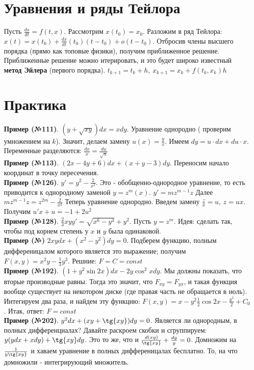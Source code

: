 \section{Уравнения и ряды Тейлора}
Пусть $\frac{dx}{dt}=f(t,x)$. Рассмотрим $x(t_0)=x_0$. Разложим в ряд
Тейлора: $x(t)=x(t_0)+\frac{dx}{dt}(t_0)(t-t_0)+o(t-t_0)$.
Отбросив члены высшего порядка (прямо как топовые физики), получим 
приближенное решение. Приближенные решение можно итерировать, и это
будет широко известный \textbf{метод Эйлера} (первого
порядка). $t_{k+1}=t_k+h,~x_{k+1}=x_k+f(t_k,x_k)h$ 

\section{Практика}
\textbf{Пример (№111)}. $(y+\sqrt{xy})dx=xdy$. Уравнение однородно (
проверим умножением на $k$). Значит, делаем замену $u(x)=\frac{y}{x}$.
Имеем $dy=u\cdot dx+du\cdot x$. Переменные разделяются: 
$\frac{dx}{x}=\frac{du}{\sqrt{u}}$\\
\textbf{Пример (№113)}. $(2x-4y+6)dx+(x+y-3)dy$. Переносим начало координат
в точку пересечения.\\
\textbf{Пример (№126)}. $y'=y^2-\frac{2}{x^2}$. Это - обобщенно-однородное
уравнение, то есть приводится к однородному заменой $y=z^m(x)$.
$y'=mz^{m-1}z$ Далее
$mz^{m-1}z=z^{2m}-\frac{2}{x^2}$ 
Теперь уравнение однородно. Введем замену $\frac{z}{x}=u,~z=ux$.
Получим $u'x+u=-1+2u^2$\\
\textbf{Пример (№128)}. $\frac{2}{3}xyy'=\sqrt{x^6-y^4}+y^2$. 
Пусть $y=z^m$. Идея: сделать так, чтобы под корнем степень у $x$ и $y$ была
одинаковой.\\
\textbf{Пример (№)} $2xydx+(x^2-y^2)dy=0$. Подберем функцию, полным 
дифференицалом которого является это выражение; получим  $F(x,y)=
x^2y-\frac{1}{3}y^3$. Решние: $F=C=const$\\
\textbf{Пример (№192)}. $(1+y^2\sin{2x})dx-2y\cos^2{x}dy$. Мы должны 
показать, что вторые производные равны. Тогда это значит, что
$F_{xy}=F_{yx}$, и такая функция вообще существует на некотором диске
(где правая часть не обращается в ноль). Интегируем два раза, и найдем эту
функцию: $F(x,y)=x-y^2 \frac{1}{2}\cos{2x}-\frac{y^2}{2}+C_0$.
Итак, ответ: $\boxed{F=const}$ \\
\textbf{Пример (№202)}. $y^2dx+(xy+\tg{xy})dy=0$. Является ли однородным,
в полных дифференциалах? Давайте раскроем скобки и сгруппируем:
$y(ydx+xdy)+\tg{xy}dy$. Это то же, что и  $\frac{d(xy)}{\tg{xy}}+\frac{dy}{y}
=0$. Домножим на $\frac{1}{y\tg{xy}}$ и хаваем уравнение в полных 
дифференицалах бесплатно. То, на что домножили - интегрирующий множитель.














